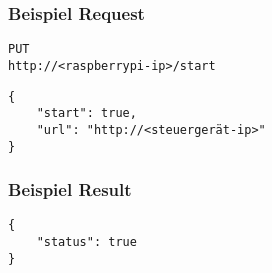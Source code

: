 \subsubsection{Beispiel Request}

\texttt{PUT} \\
\texttt{http://<raspberrypi-ip>/start}

\begin{lstlisting}[caption=PUT start Request, tabsize=2]
{
	"start": true,
	"url": "http://<steuergerät-ip>"
}
\end{lstlisting}

\subsubsection{Beispiel Result}

\begin{lstlisting}[caption=PUT start Result, tabsize=2]
{
	"status": true
}
\end{lstlisting}